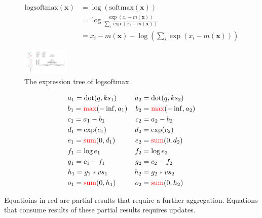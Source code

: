 \begin{align*}
  \text{logsoftmax}(\mathbf{x}) &= \log(\text{softmax}\left( \mathbf{x} \right)) \\
  &=\log \frac{\exp\left( x_i - m\left(\mathbf{x}\right)\right)}{\sum\limits_i\exp\left( x_i-m\left(\mathbf{x}\right)\right)} \\
  &= x_i - m\left(\mathbf{x}\right) - \log \left(\sum\limits_i \exp \left( x_i -m\left(\mathbf{x}\right)\right)\right)
\end{align*}

\begin{figure}[h]
  \centering
  \includegraphics[width=0.2\textwidth]{figures/logsoftmax_expression_tree.pdf}
  \caption{The expression tree of logsoftmax.}
\end{figure}

\begin{align*}
&a_1 = \text{dot}(q, ks_1) &a_2 &= \text{dot}(q, ks_2) \\
&b_1 = \textcolor{red}{\max}(-\inf, a_1) &b_2 &= \textcolor{red}{\max}(-\inf, a_2) \\
&c_1 = a_1 - b_1 &c_2&= a_2 - b_2 \\
&d_1 = \exp(c_1) &d_2&=\exp(c_2) \\
&e_1 = \textcolor{red}{\text{sum}}(0, d_1)&e_2&=\textcolor{red}{\text{sum}}(0,d_2) \\
&f_1 = \log{e_1}&f_2&=\log{e_2} \\
&g_1 = c_1 - f_1 &g_2&=c_2-f_2 \\
&h_1 = g_1 * vs_1 &h_2 &= g_2 * vs_2 \\
&o_1 = \textcolor{red}{\text{sum}}(0, h_1) &o_2 &= \textcolor{red}{\text{sum}}(0, h_2) \\
\end{align*}

Equatioins in red are partial results that require a further aggregation.
Equations that consume results of these partial results requires updates.

